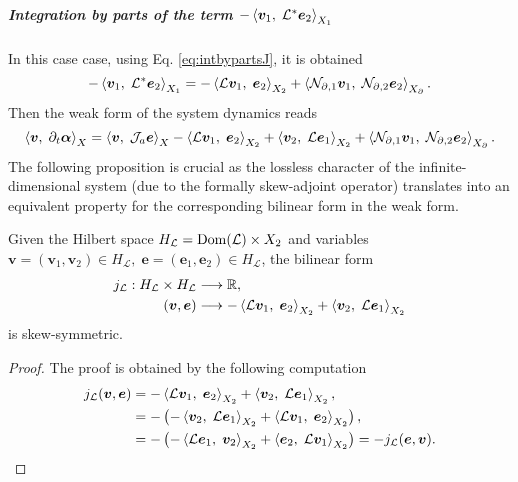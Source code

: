 \subparagraph{Integration by parts of the term $-\inner[X_1]{\bm{v}_1}{\mathcal{L}^*\bm{e}_2}$}
 In this case case, using Eq. \eqref{eq:intbypartsJ}, it is obtained 
\begin{equation}
	-\inner[X_1]{\bm{v}_1}{\mathcal{L}^*\bm{e}_2} = -\inner[X_2]{\mathcal{L}\bm{v}_1}{\bm{e}_2} + \inner[X_\partial]{\mathcal{N}_{\partial, 1} \bm{v}_1}{\mathcal{N}_{\partial, 2} \bm{e}_2}.
\end{equation}
Then the weak form of the system dynamics  reads 
\begin{equation}\label{eq:weak_dyn_intJ1}
	\inner[X]{\bm{v}}{\partial_t \bm{\alpha}} =  \inner[X]{\bm{v}}{\mathcal{J}_a\bm{e}} -\inner[X_2]{\mathcal{L}\bm{v}_1}{\bm{e}_2} + \inner[X_2]{\bm{v}_2}{\mathcal{L}\bm{e}_1} + \inner[X_\partial]{\mathcal{N}_{\partial, 1} \bm{v}_1}{\mathcal{N}_{\partial, 2} \bm{e}_2}. 
\end{equation}
The following proposition is crucial as the lossless character of the infinite-dimensional system (due to the formally skew-adjoint operator) translates into an equivalent property for the corresponding bilinear form in the weak form.
\begin{proposition}
Given the Hilbert space $H_\mathcal{L} = \Dom(\mathcal{L}) \times X_2$ and variables $\bm{v} = (\bm{v}_1, \bm{v}_2) \in H_\mathcal{L}, \; \bm{e} = (\bm{e}_1, \bm{e}_2) \in H_\mathcal{L}$, the bilinear form 
\begin{equation*}
\begin{aligned}
j_\mathcal{L}: H_\mathcal{L} \times H_\mathcal{L} &\longrightarrow \mathbb{R}, \\
(\bm{v}, \bm{e}) &\longrightarrow -\inner[X_2]{\mathcal{L}\bm{v}_1}{\bm{e}_2} + \inner[X_2]{\bm{v}_2}{\mathcal{L}\bm{e}_1}
\end{aligned}
\end{equation*}
is skew-symmetric.
\begin{proof}
The proof is obtained by the following computation
\begin{equation*}
\begin{aligned}
j_\mathcal{L}(\bm{v}, \bm{e}) &= -\inner[X_2]{\mathcal{L}\bm{v}_1}{\bm{e}_2} + \inner[X_2]{\bm{v}_2}{\mathcal{L}\bm{e}_1}, \\
&= - \left( - \inner[X_2]{\bm{v}_2}{\mathcal{L}\bm{e}_1} + \inner[X_2]{\mathcal{L}\bm{v}_1}{\bm{e}_2}\right), \\
&= - \left( - \inner[X_2]{\mathcal{L}\bm{e}_1}{\bm{v}_2} + \inner[X_2]{\bm{e}_2}{\mathcal{L}\bm{v}_1}\right) = - j_\mathcal{L}(\bm{e}, \bm{v}).
\end{aligned}
\end{equation*}
\end{proof}
\end{proposition}


